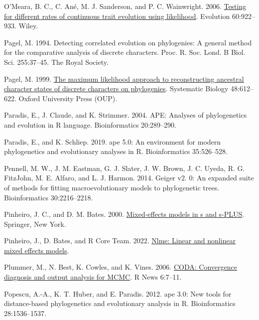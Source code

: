 \documentclass[fleqn,10pt,lineno]{wlpeerj} %
\newlength{\cslhangindent}
\newenvironment{CSLReferences}[2] %
 {\begin{list}{}{%
  \setlength{\itemindent}{0pt}
  \setlength{\leftmargin}{0pt}
  \setlength{\parsep}{0pt}
  \ifodd #1
   \setlength{\leftmargin}{\cslhangindent}
   \setlength{\itemindent}{-1\cslhangindent}
  \fi
  \setlength{\itemsep}{#2\baselineskip}}}
 {\end{list}}
\begin{document}
\begin{CSLReferences}{1}{0}
O'Meara, B. C., C. Ané, M. J. Sanderson, and P. C. Wainwright. 2006. \href{https://doi.org/10.1111/j.0014-3820.2006.tb01171.x}{Testing for different rates of continuous trait evolution using likelihood}. Evolution 60:922--933. Wiley.

Pagel, M. 1994. Detecting correlated evolution on phylogenies: A general method for the comparative analysis of discrete characters. Proc. R. Soc. Lond. B Biol. Sci. 255:37--45. The Royal Society.

Pagel, M. 1999. \href{https://doi.org/10.1080/106351599260184}{The maximum likelihood approach to reconstructing ancestral character states of discrete characters on phylogenies}. Systematic Biology 48:612--622. Oxford University Press (OUP).

Paradis, E., J. Claude, and K. Strimmer. 2004. {APE}: Analyses of phylogenetics and evolution in {R} language. Bioinformatics 20:289--290.

Paradis, E., and K. Schliep. 2019. {ape} 5.0: An environment for modern phylogenetics and evolutionary analyses in {R}. Bioinformatics 35:526--528.

Pennell, M. W., J. M. Eastman, G. J. Slater, J. W. Brown, J. C. Uyeda, R. G. FitzJohn, M. E. Alfaro, and L. J. Harmon. 2014. Geiger v2. 0: An expanded suite of methods for fitting macroevolutionary models to phylogenetic trees. Bioinformatics 30:2216--2218.

Pinheiro, J. C., and D. M. Bates. 2000. \href{https://doi.org/10.1007/b98882}{Mixed-effects models in s and s-PLUS}. Springer, New York.

Pinheiro, J., D. Bates, and R Core Team. 2022. \href{https://CRAN.R-project.org/package=nlme}{Nlme: Linear and nonlinear mixed effects models}.

Plummer, M., N. Best, K. Cowles, and K. Vines. 2006. \href{https://journal.r-project.org/archive/}{CODA: Convergence diagnosis and output analysis for MCMC}. R News 6:7--11.

Popescu, A.-A., K. T. Huber, and E. Paradis. 2012. {ape} 3.0: New tools for distance-based phylogenetics and evolutionary analysis in {R}. Bioinformatics 28:1536--1537.


\end{CSLReferences}
\end{document}
